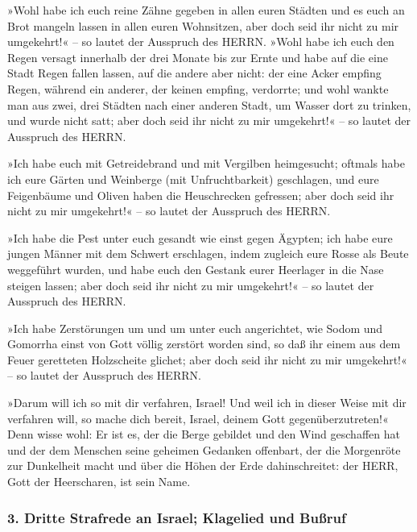»Wohl habe ich euch reine Zähne gegeben in allen euren
Städten und es euch an Brot mangeln lassen in allen euren Wohnsitzen,
aber doch seid ihr nicht zu mir umgekehrt!« -- so lautet der Ausspruch
des HERRN. »Wohl habe ich euch den Regen versagt innerhalb
der drei Monate bis zur Ernte und habe auf die eine Stadt Regen fallen
lassen, auf die andere aber nicht: der eine Acker empfing Regen, während
ein anderer, der keinen empfing, verdorrte; und wohl
wankte man aus zwei, drei Städten nach einer anderen Stadt, um Wasser
dort zu trinken, und wurde nicht satt; aber doch seid ihr nicht zu mir
umgekehrt!« -- so lautet der Ausspruch des HERRN.

»Ich habe euch mit Getreidebrand und mit Vergilben
heimgesucht; oftmals habe ich eure Gärten und Weinberge (mit
Unfruchtbarkeit) geschlagen, und eure Feigenbäume und Oliven haben die
Heuschrecken gefressen; aber doch seid ihr nicht zu mir umgekehrt!« --
so lautet der Ausspruch des HERRN.

»Ich habe die Pest unter euch gesandt wie einst gegen
Ägypten; ich habe eure jungen Männer mit dem Schwert erschlagen, indem
zugleich eure Rosse als Beute weggeführt wurden, und habe euch den
Gestank eurer Heerlager in die Nase steigen lassen; aber doch seid ihr
nicht zu mir umgekehrt!« -- so lautet der Ausspruch des HERRN.

»Ich habe Zerstörungen um und um unter euch angerichtet,
wie Sodom und Gomorrha einst von Gott völlig zerstört worden sind, so
daß ihr einem aus dem Feuer geretteten Holzscheite glichet; aber doch
seid ihr nicht zu mir umgekehrt!« -- so lautet der Ausspruch des HERRN.

»Darum will ich so mit dir verfahren, Israel! Und weil
ich in dieser Weise mit dir verfahren will, so mache dich bereit,
Israel, deinem Gott gegenüberzutreten!« Denn wisse wohl:
Er ist es, der die Berge gebildet und den Wind geschaffen hat und der
dem Menschen seine geheimen Gedanken offenbart, der die Morgenröte zur
Dunkelheit macht und über die Höhen der Erde dahinschreitet: der HERR,
Gott der Heerscharen, ist sein Name.

\hypertarget{dritte-strafrede-an-israel-klagelied-und-buuxdfruf}{%
\subsubsection{3. Dritte Strafrede an Israel; Klagelied und
Bußruf}\label{dritte-strafrede-an-israel-klagelied-und-buuxdfruf}}

